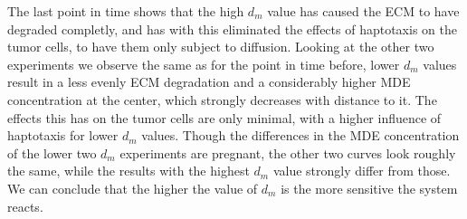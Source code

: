 The last point in time shows that the high $d_m$ value has caused the ECM to have degraded completly, and has with this eliminated the effects of haptotaxis on the tumor cells, to have them only subject to diffusion. Looking at the other two experiments we observe the same as for the point in time before, lower $d_m$ values result in a less evenly ECM degradation and a considerably higher MDE concentration at the center, which strongly decreases with distance to it. The effects this has on the tumor cells are only minimal, with a higher influence of haptotaxis for lower $d_m$ values. \newline 
Though the differences in the MDE concentration of the lower two $d_m$ experiments are pregnant, the other two curves look roughly the same, while the results with the highest $d_m$ value strongly differ from those. We can conclude that the higher the value of $d_m$ is the more sensitive the system reacts.


